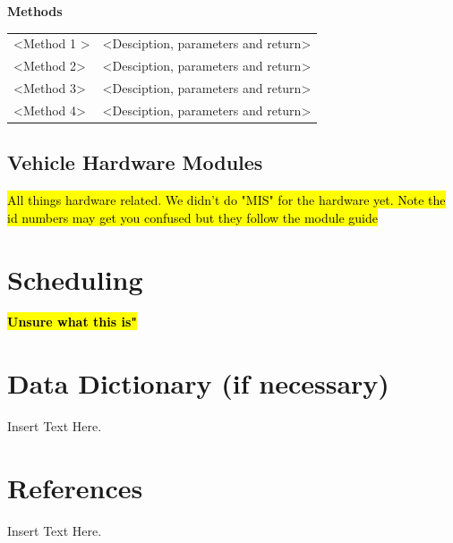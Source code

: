 \documentclass [10pt]{article}
\begin{document}
\textbf{Methods} 
\begin{longtable}{ p{ }  p{ }} \\ 

 
\rowcolor{tableCell} <Method 1 >& <Desciption, parameters and return>\\ 
<Method 2>& <Desciption, parameters and return>\\

\rowcolor{tableCell}<Method 3> & <Desciption, parameters and return> \\ 
<Method 4>& <Desciption, parameters and return> \\

\end{longtable}




\subsection{Vehicle Hardware Modules}

\begin{center}
    \hl{All things hardware related. We didn't do "MIS" for the hardware yet. Note the id numbers may get you confused but they follow the module guide}
\end{center}


\section{Scheduling}

\begin{center}
    \textbf{\hl{Unsure what this is"}}
\end{center}



\section{Data Dictionary (if necessary)}
Insert Text Here.


\section{References}
Insert Text Here.
\end{document}
